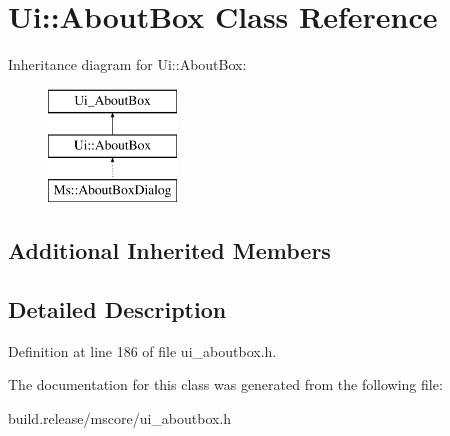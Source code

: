 \hypertarget{class_ui_1_1_about_box}{}\section{Ui\+:\+:About\+Box Class Reference}
\label{class_ui_1_1_about_box}
Inheritance diagram for Ui\+:\+:About\+Box\+:\begin{figure}[H]
\begin{center}
\leavevmode
\includegraphics[height=3.000000cm]{class_ui_1_1_about_box}
\end{center}
\end{figure}
\subsection*{Additional Inherited Members}


\subsection{Detailed Description}


Definition at line 186 of file ui\+\_\+aboutbox.\+h.



The documentation for this class was generated from the following file\+:\begin{DoxyCompactItemize}
\item 
build.\+release/mscore/ui\+\_\+aboutbox.\+h\end{DoxyCompactItemize}
